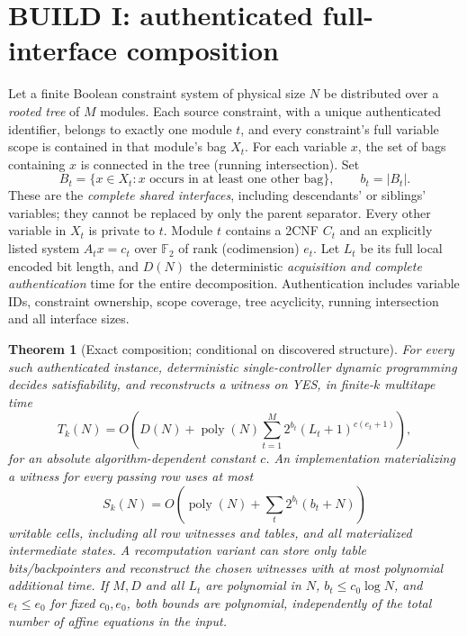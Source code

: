 \documentclass[11pt]{article}
\newtheorem{theorem}{Theorem}
\newcommand{\GF}{\mathbb F_2}
\begin{document}
\section{BUILD I: authenticated full-interface composition}
Let a finite Boolean constraint system of physical size $N$ be distributed over a \emph{rooted tree} of $M$ modules. Each source constraint, with a unique authenticated identifier, belongs to exactly one module $t$, and every constraint's full variable scope is contained in that module's bag $X_t$. For each variable $x$, the set of bags containing $x$ is connected in the tree (running intersection). Set
\[
B_t=\{x\in X_t: x\text{ occurs in at least one other bag}\},\qquad b_t=|B_t|.
\]
These are the \emph{complete shared interfaces}, including descendants' or siblings' variables; they cannot be replaced by only the parent separator. Every other variable in $X_t$ is private to $t$. Module $t$ contains a 2CNF $C_t$ and an explicitly listed system $A_tx=c_t$ over $\GF$ of rank (codimension) $e_t$. Let $L_t$ be its full local encoded bit length, and $D(N)$ the deterministic \emph{acquisition and complete authentication} time for the entire decomposition. Authentication includes variable IDs, constraint ownership, scope coverage, tree acyclicity, running intersection and all interface sizes.
\begin{theorem}[Exact composition; conditional on discovered structure]
For every such authenticated instance, deterministic single-controller dynamic programming decides satisfiability, and reconstructs a witness on YES, in finite-$k$ multitape time
\[
T_k(N)=O\!\left(D(N)+\operatorname{poly}(N)\sum_{t=1}^{M}2^{b_t}(L_t+1)^{c(e_t+1)}\right),
\]
for an absolute algorithm-dependent constant $c$. An implementation materializing a witness for every passing row uses at most
\[
S_k(N)=O\!\left(\operatorname{poly}(N)+\sum_t2^{b_t}(b_t+N)\right)
\]
writable cells, including all row witnesses and tables, and all materialized intermediate states. A recomputation variant can store only table bits/backpointers and reconstruct the chosen witnesses with at most polynomial additional time. If $M,D$ and all $L_t$ are polynomial in $N$, $b_t\le c_0\log N$, and $e_t\le e_0$ for fixed $c_0,e_0$, both bounds are polynomial, independently of the total number of affine equations in the input.
\end{theorem}
\end{document}
